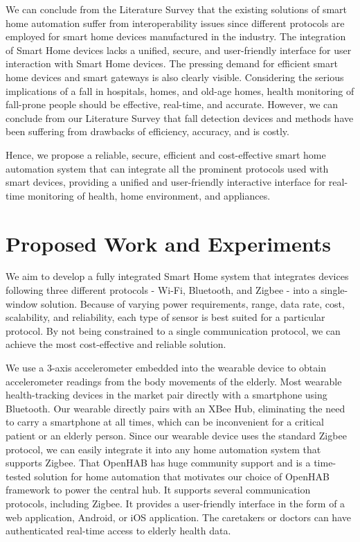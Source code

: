 We can conclude from the Literature Survey that the existing solutions of smart home automation suffer from interoperability issues since different protocols are employed for smart home devices manufactured in the industry. The integration of Smart Home devices lacks a unified, secure, and user-friendly interface for user interaction with Smart Home devices. The pressing demand for efficient smart home devices and smart gateways is also clearly visible. Considering the serious implications of a fall in hospitals, homes, and old-age homes, health monitoring of fall-prone people should be effective, real-time, and accurate. However, we can conclude from our Literature Survey that fall detection devices and methods have been suffering from drawbacks of efficiency, accuracy, and is costly.

Hence, we propose a reliable, secure, efficient and cost-effective smart home automation system that can integrate all the prominent protocols used with smart devices, providing a unified and user-friendly interactive interface for real-time monitoring of health, home environment, and appliances. 

\section{Proposed Work and Experiments}

We aim to develop a fully integrated Smart Home system that integrates devices following three different protocols - Wi-Fi, Bluetooth, and Zigbee - into a single-window solution. Because of varying power requirements, range, data rate, cost, scalability, and reliability, each type of sensor is best suited for a particular protocol. By not being constrained to a single communication protocol, we can achieve the most cost-effective and reliable solution. 

We use a 3-axis accelerometer embedded into the wearable device to obtain accelerometer readings from the body movements of the elderly. Most wearable health-tracking devices in the market pair directly with a smartphone using Bluetooth. Our wearable directly pairs with an XBee Hub, eliminating the need to carry a smartphone at all times, which can be inconvenient for a critical patient or an elderly person. Since our wearable device uses the standard Zigbee protocol, we can easily integrate it into any home automation system that supports Zigbee. That OpenHAB has huge community support and is a time-tested solution for home automation that motivates our choice of OpenHAB framework to power the central hub. It supports several communication protocols, including Zigbee. It provides a user-friendly interface in the form of a web application, Android, or iOS application. The caretakers or doctors can have authenticated real-time access to elderly health data. 

